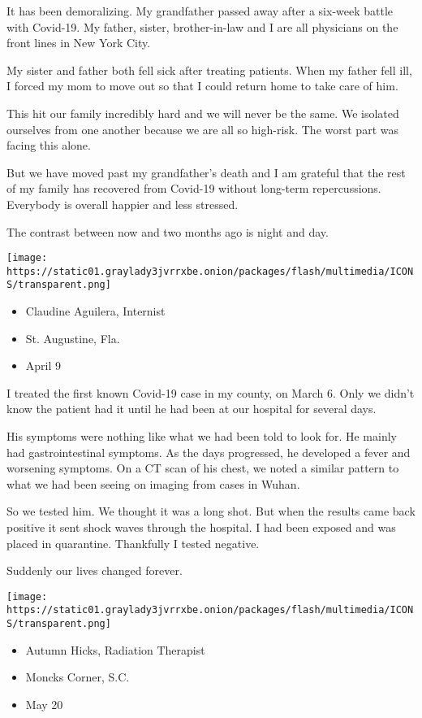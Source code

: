 It has been demoralizing. My grandfather passed away after a six-week
battle with Covid-19. My father, sister, brother-in-law and I are all
physicians on the front lines in New York City.

My sister and father both fell sick after treating patients. When my
father fell ill, I forced my mom to move out so that I could return home
to take care of him.

This hit our family incredibly hard and we will never be the same. We
isolated ourselves from one another because we are all so high-risk. The
worst part was facing this alone.

But we have moved past my grandfather's death and I am grateful that the
rest of my family has recovered from Covid-19 without long-term
repercussions. Everybody is overall happier and less stressed.

The contrast between now and two months ago is night and day.

\texttt{[image: https://static01.graylady3jvrrxbe.onion/packages/flash/multimedia/ICONS/transparent.png]}

\begin{itemize}
\tightlist
\item
  Claudine Aguilera, Internist
\item
  St. Augustine, Fla.
\item
  April 9
\end{itemize}

I treated the first known Covid-19 case in my county, on March 6. Only
we didn't know the patient had it until he had been at our hospital for
several days.

His symptoms were nothing like what we had been told to look for. He
mainly had gastrointestinal symptoms. As the days progressed, he
developed a fever and worsening symptoms. On a CT scan of his chest, we
noted a similar pattern to what we had been seeing on imaging from cases
in Wuhan.

So we tested him. We thought it was a long shot. But when the results
came back positive it sent shock waves through the hospital. I had been
exposed and was placed in quarantine. Thankfully I tested negative.

Suddenly our lives changed forever.

\texttt{[image: https://static01.graylady3jvrrxbe.onion/packages/flash/multimedia/ICONS/transparent.png]}

\begin{itemize}
\tightlist
\item
  Autumn Hicks, Radiation Therapist
\item
  Moncks Corner, S.C.
\item
  May 20
\end{itemize}

